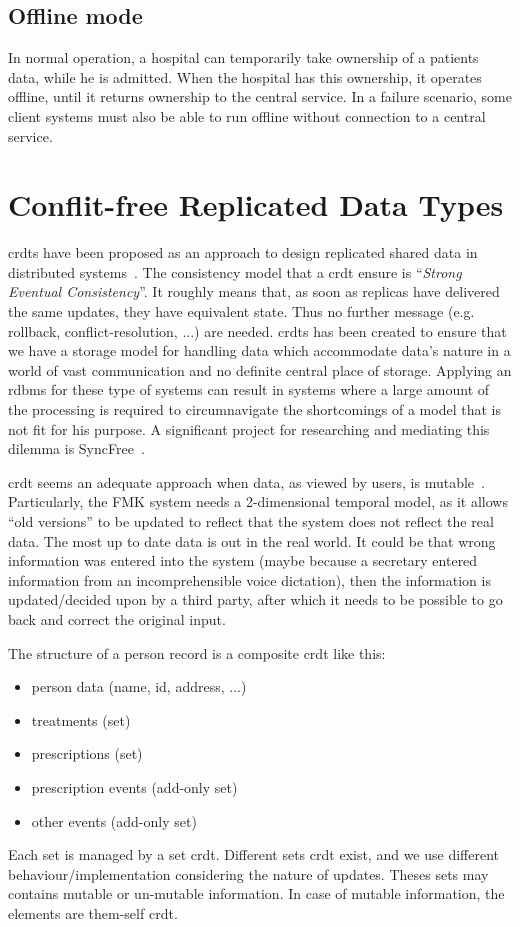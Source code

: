 \documentclass[english]{article}
\begin{document}
\subsection{Offline mode}

In normal operation, a hospital can temporarily take ownership of a patients data, while he is admitted. When the hospital has this
ownership, it operates offline, until it returns ownership to the central service. In a failure scenario, some client systems must also be able to run offline without connection to a central service. 


\section{Conflit-free Replicated Data Types}

\glspl{crdt} have been proposed as an approach to design replicated shared data in distributed systems~\cite{shapiro11conflictfree}. The consistency model that a \gls{crdt} ensure is ``{\em Strong Eventual Consistency}''. It roughly means that, as soon as replicas have delivered the same updates, they have equivalent state. Thus no further message (e.g. rollback, conflict-resolution, ...) are needed. \glspl{crdt} has been created to ensure that we have a storage model for handling data which accommodate data's nature in a world of vast communication and no definite central place of storage. Applying an \gls{rdbms} for these type of systems can result in systems where a large amount of the processing is required to circumnavigate the shortcomings of a model that is not fit for his purpose. A significant project for researching and mediating this dilemma is SyncFree~\cite{syncfree}.

\gls{crdt} seems an adequate approach when data, as viewed by users, is mutable~\cite{weiss10logootundo}. Particularly, the FMK system needs a
2-dimensional temporal model, as it allows ``old versions'' to be updated to reflect that the system does not reflect the real data. The most up to date data is out in the real world. It could be that wrong information was entered into the system (maybe because a secretary entered information from an incomprehensible voice dictation), then the information is updated/decided upon by a third party, after which it needs to be possible to go back and correct the original input.

The structure of a person record is a composite \gls{crdt} like this: 
\begin{itemize}
	\item person data (name, id, address, ...) 
	\item treatments (set)
	\item prescriptions (set) 
	\item prescription events (add-only set)
	\item other events (add-only set)
\end{itemize}
Each set is managed by a set \gls{crdt}. Different sets \gls{crdt} exist, and we use different behaviour/implementation considering the nature of
updates. Theses sets may contains mutable or un-mutable information. In case of mutable information, the elements are them-self \gls{crdt}.
\end{document}
